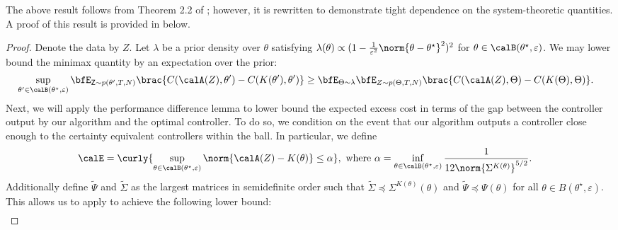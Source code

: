 The above result follows from Theorem 2.2 of \citet{lee2023fundamental}; however, it is rewritten to demonstrate tight dependence on the system-theoretic quantities. A proof of this result is provided in below.

\begin{proof}
    

Denote the data by $Z$. Let $\lambda$ be a prior density over $\theta$ satisfying $\lambda(\theta) \propto (1 - \frac{1}{\varepsilon^2} \norm{\theta - \theta^\star}^2)^2$ for $\theta \in \calB(\theta^\star, \varepsilon)$. We may lower bound the minimax quantity by an expectation over the prior:
\begin{align*}
    &\sup_{\theta'\in\calB(\theta^\star, \varepsilon)} \bfE_{\mathsf{Z} \sim p(\theta', T, N)} \brac{C(\calA(Z), \theta') -C(K(\theta'), \theta') } \geq \bfE_{\Theta \sim \lambda} \bfE_{Z \sim p(\Theta, T, N)} \brac{C(\calA(Z), \Theta) -C(K(\Theta), \Theta) }.
    \end{align*}
Next, we will apply the performance difference lemma to lower bound the expected excess cost in terms of the gap between the controller output by our algorithm and the optimal controller. To do so, we condition on the event that our algorithm outputs a controller close enough to the certainty equivalent controllers within the ball. In particular, we define 
\begin{align*}
    \calE &= \curly{\sup_{\theta\in\calB(\theta^\star, \varepsilon)} \norm{\calA(Z) - K(\theta)} \leq \alpha }, \mbox{ where }
    \alpha = \inf_{\theta\in\calB(\theta^\star, \varepsilon)} \frac{1}{12 \norm{\Sigma^{K(\theta)}}^{5/2}}.%
\end{align*}
Additionally define $\tilde \Psi$ and $\tilde \Sigma$ as the largest matrices in semidefinite order such that $\tilde \Sigma \preceq \Sigma^{K(\theta)}(\theta)$ and $\tilde \Psi \preceq \Psi(\theta)$ for all $\theta \in B(\theta^\star, \varepsilon)$. 
This allows us to apply  to achieve the following lower bound:
\begin{align*}

\end{align*}
\end{proof}
